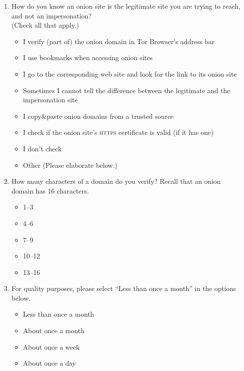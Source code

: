 \begin{enumerate}
    \item How do you know an onion site is the legitimate site you are trying
        to reach, and not an impersonation?\\(Check all that apply.)
        \begin{itemize}[label=$\Square$]
            \item I verify (part of) the onion domain in Tor Browser's address
                bar
            \item I use bookmarks when accessing onion sites
            \item I go to the corresponding web site and look for the link to
                its onion site
            \item Sometimes I cannot tell the difference between the legitimate
                and the impersonation site
            \item I copy\&paste onion domains from a trusted source
            \item I check if the onion site's \textsc{https} certificate is
                valid (if it has one)
            \item I don't check
            \item Other (Please elaborate below.)
        \end{itemize}

    \item How many characters of a domain do you verify? Recall that an onion
        domain has 16 characters.
        \begin{itemize}[label=$\Circle$]
            \item 1--3
            \item 4--6
            \item 7--9
            \item 10--12
            \item 13--16
        \end{itemize}

    \item For quality purposes, please select ``Less than once a month'' in the
        options below.
        \begin{itemize}[label=$\Circle$]
            \item Less than once a month
            \item About once a month
            \item About once a week
            \item About once a day
        \end{itemize}


\end{enumerate}
